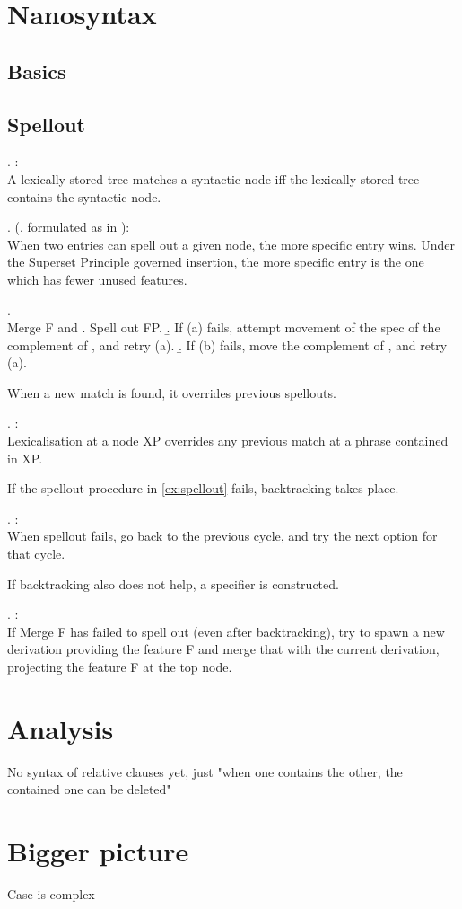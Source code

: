 \section{Nanosyntax}

\subsection{Basics}

\subsection{Spellout}

\ex.  \citet{starke2009}:\\
A lexically stored tree matches a syntactic node iff the lexically stored tree contains the syntactic node.

\ex.  (\citealt{kiparsky1973}, formulated as in \citealt{caha2020}):\\
When two entries can spell out a given node, the more specific entry wins. Under the Superset Principle governed insertion, the more specific entry is the one which has fewer unused features.

\ex. \\
Merge F and \label{ex:spellout}
 \a. Spell out FP.
 \b. If (a) fails, attempt movement of the spec of the complement of , and retry (a).
 \b. If (b) fails, move the complement of , and retry (a).

When a new match is found, it overrides previous spellouts.

\ex.  \citep{starke2018}:\\
Lexicalisation at a node XP overrides any previous match at a phrase contained in XP.

If the spellout procedure in \ref{ex:spellout} fails, backtracking takes place.

\ex.  \citep{starke2018}:\\
When spellout fails, go back to the previous cycle, and try the next option for that cycle.\label{ex:backtracking}

If backtracking also does not help, a specifier is constructed.

\ex.  \citep{starke2018}:\\
If Merge F has failed to spell out (even after backtracking), try to spawn a new derivation providing the feature F and merge that with the current derivation, projecting the feature F at the top node.\label{ex:specformation}



\section{Analysis}

No syntax of relative clauses yet, just "when one contains the other, the contained one can be deleted"




\section{Bigger picture}

Case is complex
